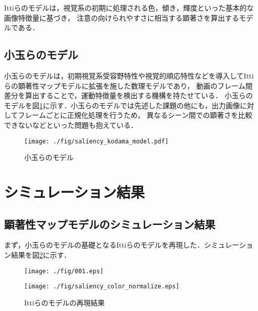 Ittiらのモデルは，視覚系の初期に処理される色，傾き，輝度といった基本的な画像特徴量に基づき，
注意の向けられやすさに相当する顕著さを算出するモデルである．

\subsection{小玉らのモデル}
小玉らのモデルは，初期視覚系受容野特性や視覚的順応特性などを導入してIttiらの顕著性マップモデルに拡張を施した数理モデルであり，
動画のフレーム間差分を算出することで，運動特徴量を検出する機構を持たせている．
小玉らのモデルを図\ref{fig:kodama}に示す．小玉らのモデルでは先述した課題の他にも，出力画像に対してフレームごとに正規化処理を行うため，
異なるシーン間での顕著さを比較できないなどといった問題も抱えている．

\begin{figure}[h]
 \centering
 \texttt{[image: ./fig/saliency\_kodama\_model.pdf]}
 \centering
  \caption{小玉らのモデル}
 \label{fig:kodama}
\end{figure}
\vspace*{-6mm}

\section{シミュレーション結果}
\vspace{-3.2mm}
\subsection{顕著性マップモデルのシミュレーション結果}
まず，小玉らのモデルの基礎となるIttiらのモデルを再現した．シミュレーション結果を図\ref{fig:itti_saliency}に示す．
\vspace{-1.2mm}
\begin{figure}[h]
    \begin{minipage}[h]{0.5\hsize}
      \centering
      \texttt{[image: ./fig/001.eps]}
      \label{fig:input}
    \end{minipage}
    \begin{minipage}[h]{0.5\hsize}
      \centering
      \texttt{[image: ./fig/saliency\_color\_normalize.eps]}
      \label{fig:output}
    \end{minipage}
    \vspace{0.5mm}
    \caption{Ittiらのモデルの再現結果}
    \label{fig:itti_saliency}
\end{figure}

